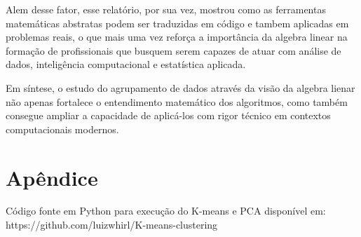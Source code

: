 \documentclass[a4paper,12pt]{article}
\begin{document}
Alem desse fator, esse relatório, por sua vez, mostrou como as ferramentas matemáticas abstratas podem ser traduzidas em código e tambem aplicadas em problemas reais, o que mais uma vez reforça a importância da algebra linear na formação de profissionais que busquem serem capazes de atuar com análise de dados, inteligência computacional e estatística aplicada.

Em síntese, o estudo do agrupamento de dados através da visão da algebra lienar não apenas fortalece o entendimento matemático dos algoritmos, como também consegue ampliar a capacidade de aplicá-los com rigor técnico em contextos computacionais modernos.

\newpage
\renewcommand{\refname}{\section{Referências}
\addcontentsline*{toc}{section}{}}



    \section{Apêndice}
Código fonte em Python para execução do K-means e PCA disponível em:
https://github.com/luizwhirl/K-means-clustering
\end{document}
